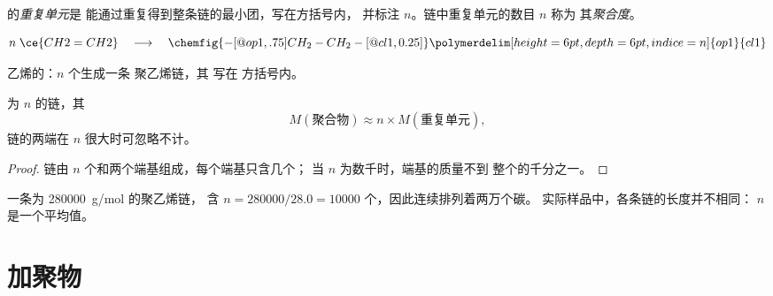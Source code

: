 \begin{definition}\label{def:g12:polymers:repeat-unit}
的\emph{重复单元}是
能通过重复得到整条链的最小团，写在方括号内，
并标注 $n$。链中重复单元的数目 $n$ 称为
其\emph{聚合度}。
\end{definition}

\begin{omfigure}
\[
  n\;\ce{CH2=CH2}
  \quad\longrightarrow\quad
  \chemfig{-[@{op1,.75}]CH_2-CH_2-[@{cl1,0.25}]}
  \polymerdelim[height=6pt, depth=6pt, indice=n]{op1}{cl1}
\]

{\small 乙烯的：$n$ 个生成一条
聚乙烯链，其  写在
方括号内。}
\end{omfigure}

\begin{proposition}[聚合物的摩尔质量]\label{prop:g12:polymers:molar-mass}
为 $n$ 的链，其
\[
  M(\text{聚合物}) \approx n \times M(\text{重复单元}) ,
\]
链的两端在 $n$ 很大时可忽略不计。
\end{proposition}

\begin{proof}
链由 $n$ 个和两个端基组成，每个端基只含几个；
当 $n$ 为数千时，端基的质量不到
整个的千分之一。
\end{proof}

\begin{example}[一条聚乙烯链]\label{ex:g12:polymers:pe}
一条为 \qty{280000}{g/mol} 的聚乙烯链，
含 $n = 280000/28.0 = 10000$ 个，因此连续排列着两万个碳。
实际样品中，各条链的长度并不相同：
$n$ 是一个平均值。
\end{example}

\section{加聚物}

